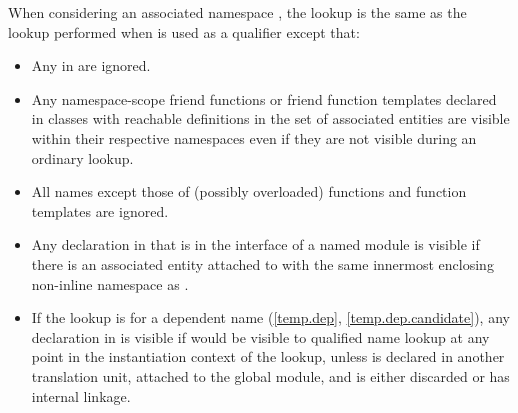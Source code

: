 \pnum
When considering an associated namespace ,
the lookup is the same as the
lookup performed when 
is used as a qualifier
except that:
\begin{itemize}
\item Any  in  are ignored.

\item Any namespace-scope friend functions or friend function templates
declared in classes with reachable definitions in the set of associated entities
are visible within their respective
namespaces even if they are not visible during an ordinary
lookup.

\item All names except those of (possibly overloaded) functions and
function templates are ignored.

\item
Any declaration  in 
that is in the interface of
a named module 
is visible
if there is an associated entity attached to 
with the same innermost enclosing non-inline namespace as .

\item
If the lookup is for a dependent name (\ref{temp.dep}, \ref{temp.dep.candidate}),
any declaration  in 
is visible
if  would be visible to qualified name lookup
at any point in the instantiation context of the lookup,
unless  is declared in another translation unit, attached to the global module,
and is either discarded or has internal linkage.
\end{itemize}

